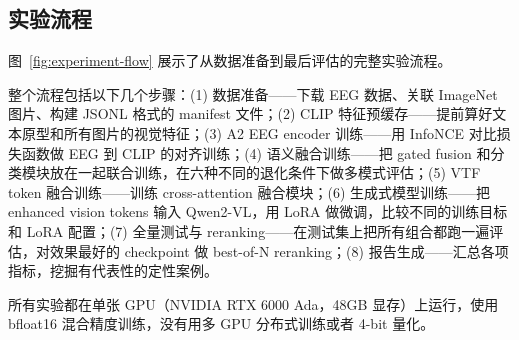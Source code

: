 \subsection{实验流程}

图~\ref{fig:experiment-flow} 展示了从数据准备到最后评估的完整实验流程。


整个流程包括以下几个步骤：(1) 数据准备——下载 EEG 数据、关联 ImageNet 图片、构建 JSONL 格式的 manifest 文件；(2) CLIP 特征预缓存——提前算好文本原型和所有图片的视觉特征；(3) A2 EEG encoder 训练——用 InfoNCE 对比损失函数做 EEG 到 CLIP 的对齐训练；(4) 语义融合训练——把 gated fusion 和分类模块放在一起联合训练，在六种不同的退化条件下做多模式评估；(5) VTF token 融合训练——训练 cross-attention 融合模块；(6) 生成式模型训练——把 enhanced vision tokens 输入 Qwen2-VL，用 LoRA 做微调，比较不同的训练目标和 LoRA 配置；(7) 全量测试与 reranking——在测试集上把所有组合都跑一遍评估，对效果最好的 checkpoint 做 best-of-N reranking；(8) 报告生成——汇总各项指标，挖掘有代表性的定性案例。

所有实验都在单张 GPU（NVIDIA RTX 6000 Ada，48GB 显存）上运行，使用 bfloat16 混合精度训练，没有用多 GPU 分布式训练或者 4-bit 量化。
